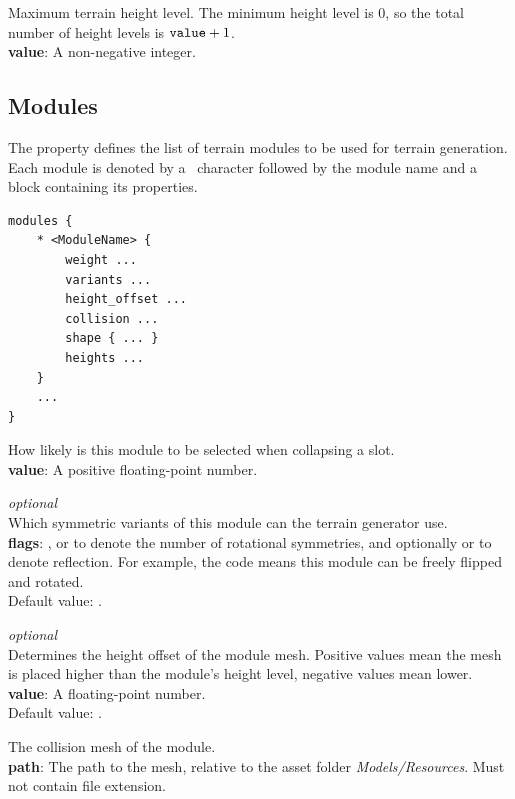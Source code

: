 Maximum terrain height level.
The minimum height level is 0, so the total number of height levels is $\texttt{value} + 1$.\\
\textbf{value}: A non-negative integer.

\subsection{Modules}

The  property defines the list of terrain modules to be used for terrain generation.
Each module is denoted by a \mono{*}~character followed by the module name and a block containing its properties.

\begin{verbatim}
modules {
    * <ModuleName> {
        weight ...
        variants ...
        height_offset ...
        collision ...
        shape { ... }
        heights ...
    }
    ...
}
\end{verbatim}

How likely is this module to be selected when collapsing a slot.\\
\textbf{value}: A positive floating-point number.

\emph{optional}\\
Which symmetric variants of this module can the terrain generator use.\\
\textbf{flags}: ,  or  to denote the number of rotational symmetries, and optionally  or  to denote reflection.
For example, the code  means this module can be freely flipped and rotated.\\
Default value: .

\emph{optional}\\
Determines the height offset of the module mesh.
Positive values mean the mesh is placed higher than the module's height level, negative values mean lower.\\
\textbf{value}: A floating-point number.\\
Default value: .

The collision mesh of the module.\\
\textbf{path}: The path to the mesh, relative to the asset folder \emph{Models/Resources}. Must not contain file extension.


